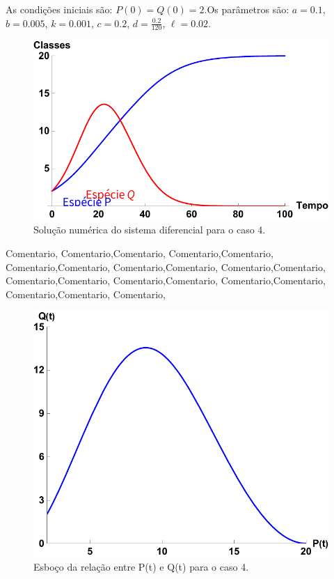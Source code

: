 As condições iniciais são: $P(0)=Q(0)=2$.\newline Os parâmetros são:  $a=0.1$, $b=0.005$, $k=0.001$, $c=0.2$, $d=\frac{0.2}{120}$, $\ell=0.02$.
\begin{figure}[htbp]
\centering
\includegraphics[keepaspectratio=true,scale=0.75]{caso4_a.pdf}
\caption{Solução numérica do sistema diferencial para o caso 4.}
\label{fig:w}
\end{figure}
\bigskip
\noindent
Comentario, Comentario,Comentario, Comentario,Comentario, Comentario,Comentario, Comentario,Comentario, Comentario,Comentario, Comentario,Comentario, Comentario,Comentario, Comentario,Comentario, Comentario,Comentario, Comentario,
\begin{figure}[htbp]
\centering
\includegraphics[keepaspectratio=true,scale=0.5]{caso4_b.pdf}
\caption{Esboço da relação entre P(t) e Q(t) para o caso 4.}
\label{fig:ww}
\end{figure}
